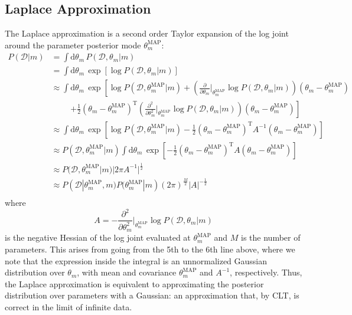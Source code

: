 \documentclass[a4paper]{article}
\begin{document}
\subsection{Laplace Approximation}
The Laplace approximation is a second order Taylor expansion of the log joint around the parameter posterior mode $\theta_m^\textrm{MAP}$:
\begin{align*}
P(\mathcal{D}|m) &= \int\textrm{d}\theta_m\, P(\mathcal{D},\theta_m| m) \\
&= \int\textrm{d}\theta_m\, \exp\left[ \log P(\mathcal{D},\theta_m| m)\right] \\
&\approx \int\textrm{d}\theta_m\, \exp\left[\log P(\mathcal{D},\theta_m^\textrm{MAP}| m) + \left(\frac{\partial}{\partial \theta_m}\Bigr|_{\theta_m^\textrm{MAP}} \log P(\mathcal{D},\theta_m| m)\right)\left(\theta_m - \theta_m^\textrm{MAP}\right)\right. \\
&\phantom{{}=15} \left. + \frac{1}{2}\left(\theta_m - \theta_m^\textrm{MAP}\right)^\textrm{T}\left(\frac{\partial^2}{\partial \theta_m^2}\Bigr|_{\theta_m^\textrm{MAP}} \log P(\mathcal{D},\theta_m| m)\right)\left(\theta_m - \theta_m^\textrm{MAP}\right) \right]\\
&\approx \int\textrm{d}\theta_m\, \exp\left[\log P(\mathcal{D},\theta_m^\textrm{MAP}| m) - \frac{1}{2}\left(\theta_m - \theta_m^\textrm{MAP}\right)^\textrm{T}A^{-1}\left(\theta_m - \theta_m^\textrm{MAP}\right) \right] \\
&\approx P(\mathcal{D},\theta_m^\textrm{MAP}| m) \int\textrm{d}\theta_m\, \exp\left[- \frac{1}{2}\left(\theta_m - \theta_m^\textrm{MAP}\right)^\textrm{T}A\left(\theta_m - \theta_m^\textrm{MAP}\right) \right] \\
&\approx P(\mathcal{D},\theta_m^\textrm{MAP}| m) |2\pi A^{-1}|^\frac{1}{2} \\
&\approx P(\mathcal{D}|\theta_m^\textrm{MAP}, m)P(\theta_m^\textrm{MAP}| m) (2\pi)^\frac{M}{2} |A|^{-\frac{1}{2}} \\
\end{align*}
where
\[ A = -\frac{\partial^2}{\partial \theta_m^2}\Bigr|_{\theta_m^\textrm{MAP}}\log P(\mathcal{D},\theta_m| m) \]
is the negative Hessian of the log joint evaluated at $\theta_m^\textrm{MAP}$ and $M$ is the number of parameters. This arises from going from the 5th to the 6th line above, where we note that the expression inside the integral is an unnormalized Gaussian distribution over $\theta_m$, with mean and covariance $\theta_m^\textrm{MAP}$ and $A^{-1}$, respectively. Thus, the Laplace approximation is equivalent to approximating the posterior distribution over parameters with a Gaussian: an approximation that, by CLT, is correct in the limit of infinite data.
\end{document}
